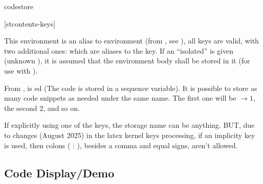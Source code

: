 \documentclass{article}
\begin{document}
\begin{codedescribe}[env]{codestore}
	\begin{codesyntax}
		\tsmacro{\begin{codestore}}[stcontents-keys]{}
    \tsmacro{\end{codestore}}{}
	\end{codesyntax}
This environment is an alias to  environment (from , see \cite{SCONTENTS}), all  keys are valid, with two additional ones:  which are aliases to the  key. If an ``isolated''  is given (unknown ), it is assumed that the environment body shall be stored in it (for use with ).
\end{codedescribe}
\begin{tsremark}
  From ,  is ed (The code is stored in a sequence variable). It is possible to store as many code snippets as needed under the same name. The first one will be $\rightarrow 1$, the second $2$, and so on.
\end{tsremark}
\begin{tsremark}
  If explicitly using one of the  keys, the storage name can be anything. BUT, due to changes (August 2025) in the latex kernel keys processing, if an implicity key is used,  then colons ( : ), besides a comma and equal signs, aren't allowed.
\end{tsremark}




\subsection{Code Display/Demo}\label{codelist}
\end{document}
